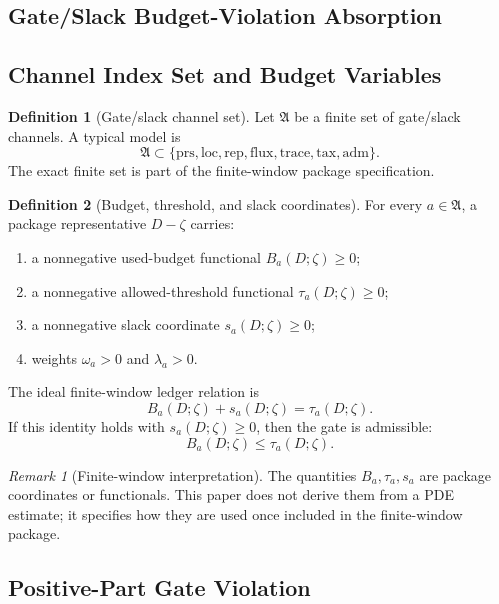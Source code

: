 \documentclass[11pt]{article}
\numberwithin{equation}{section}
\theoremstyle{definition}
\newtheorem{definition}[definition]{Definition}
\theoremstyle{remark}
\newtheorem{remark}[remark]{Remark}
\newcommand{\loc}{\mathrm{loc}}
\newcommand{\adm}{\mathrm{adm}}
\newcommand{\prs}{\mathrm{prs}}
\newcommand{\rep}{\mathrm{rep}}
\newcommand{\Achan}{\mathfrak A}
\begin{document}
\subsection*{Gate/Slack Budget-Violation Absorption}
\subsection{Channel Index Set and Budget Variables}
\label{gs:sec:channels}

\begin{definition}[Gate/slack channel set]
\label{gs:def:channel-set}
Let \(\Achan\) be a finite set of gate/slack channels.  A typical model is
\[
    \Achan
    \subset
    \{\prs,\loc,\rep,\mathrm{flux},\mathrm{trace},\mathrm{tax},\adm\}.
\]
The exact finite set is part of the finite-window package specification.
\end{definition}

\begin{definition}[Budget, threshold, and slack coordinates]
\label{gs:def:budget-threshold-slack}
For every \(a\in\Achan\), a package representative \(D-\zeta\) carries:
\begin{enumerate}[label=\textup{(\roman*)},leftmargin=*]
    \item a nonnegative used-budget functional \(B_a(D;\zeta)\ge0\);
    \item a nonnegative allowed-threshold functional \(\tau_a(D;\zeta)\ge0\);
    \item a nonnegative slack coordinate \(s_a(D;\zeta)\ge0\);
    \item weights \(\omega_a>0\) and \(\lambda_a>0\).
\end{enumerate}
The ideal finite-window ledger relation is
\[
    B_a(D;\zeta)+s_a(D;\zeta)=\tau_a(D;\zeta).
\]
If this identity holds with \(s_a(D;\zeta)\ge0\), then the gate is admissible:
\[
    B_a(D;\zeta)\le \tau_a(D;\zeta).
\]
\end{definition}

\begin{remark}[Finite-window interpretation]
The quantities \(B_a,\tau_a,s_a\) are package coordinates or functionals.  This
paper does not derive them from a PDE estimate; it specifies how they are used
once included in the finite-window package.
\end{remark}

\subsection{Positive-Part Gate Violation}
\label{gs:sec:positive-gate}
\end{document}
